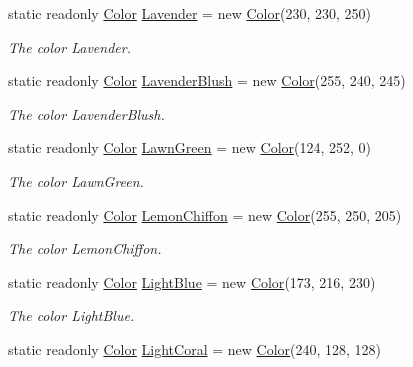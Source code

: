 \begin{DoxyCompactItemize}
static readonly \hyperlink{struct_tri_devs_1_1_tri_engine2_d_1_1_color}{Color} \hyperlink{struct_tri_devs_1_1_tri_engine2_d_1_1_color_ac945af6ee35194b137448fa868afca4d}{Lavender} = new \hyperlink{struct_tri_devs_1_1_tri_engine2_d_1_1_color}{Color}(230, 230, 250)
\begin{DoxyCompactList}\small\item\em The color Lavender. \end{DoxyCompactList}\item 
static readonly \hyperlink{struct_tri_devs_1_1_tri_engine2_d_1_1_color}{Color} \hyperlink{struct_tri_devs_1_1_tri_engine2_d_1_1_color_a3cce2e15246bc8bab8dd0996da22210d}{Lavender\-Blush} = new \hyperlink{struct_tri_devs_1_1_tri_engine2_d_1_1_color}{Color}(255, 240, 245)
\begin{DoxyCompactList}\small\item\em The color Lavender\-Blush. \end{DoxyCompactList}\item 
static readonly \hyperlink{struct_tri_devs_1_1_tri_engine2_d_1_1_color}{Color} \hyperlink{struct_tri_devs_1_1_tri_engine2_d_1_1_color_a9cdcea195fc07dc028f98582d3591cde}{Lawn\-Green} = new \hyperlink{struct_tri_devs_1_1_tri_engine2_d_1_1_color}{Color}(124, 252, 0)
\begin{DoxyCompactList}\small\item\em The color Lawn\-Green. \end{DoxyCompactList}\item 
static readonly \hyperlink{struct_tri_devs_1_1_tri_engine2_d_1_1_color}{Color} \hyperlink{struct_tri_devs_1_1_tri_engine2_d_1_1_color_aa5ee1fd84bfe6589f1e6316c7ca9315e}{Lemon\-Chiffon} = new \hyperlink{struct_tri_devs_1_1_tri_engine2_d_1_1_color}{Color}(255, 250, 205)
\begin{DoxyCompactList}\small\item\em The color Lemon\-Chiffon. \end{DoxyCompactList}\item 
static readonly \hyperlink{struct_tri_devs_1_1_tri_engine2_d_1_1_color}{Color} \hyperlink{struct_tri_devs_1_1_tri_engine2_d_1_1_color_a26b55d84e33cf11eec00825edfd0dc71}{Light\-Blue} = new \hyperlink{struct_tri_devs_1_1_tri_engine2_d_1_1_color}{Color}(173, 216, 230)
\begin{DoxyCompactList}\small\item\em The color Light\-Blue. \end{DoxyCompactList}\item 
static readonly \hyperlink{struct_tri_devs_1_1_tri_engine2_d_1_1_color}{Color} \hyperlink{struct_tri_devs_1_1_tri_engine2_d_1_1_color_af88ac202a4d5daf36ce4d5d88537cba6}{Light\-Coral} = new \hyperlink{struct_tri_devs_1_1_tri_engine2_d_1_1_color}{Color}(240, 128, 128)

\end{DoxyCompactItemize}
